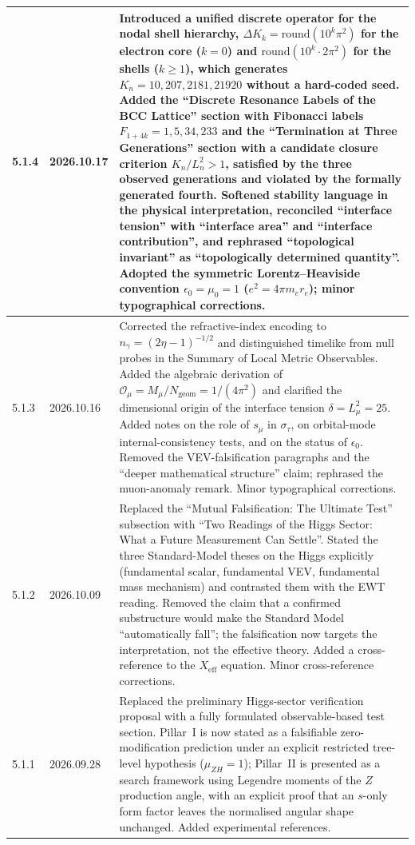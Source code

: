 \documentclass[10pt,a4paper]{article}
\begin{document}
\begin{longtable}{@{}p{1.6cm}p{1.8cm}p{10.1cm}@{}}
	5.1.4 & 2026.10.17 &
	Introduced a unified discrete operator for the nodal shell hierarchy,
	$\Delta K_k = \mathrm{round}(10^k \pi^2)$ for the electron core
	($k=0$) and $\mathrm{round}(10^k \cdot 2\pi^2)$ for the shells
	($k\geq 1$), which generates $K_n = 10, 207, 2181, 21920$ without a
	hard-coded seed. Added the ``Discrete Resonance Labels of the BCC
	Lattice'' section with Fibonacci labels $F_{1+4k} = 1, 5, 34, 233$
	and the ``Termination at Three Generations'' section with a candidate
	closure criterion $K_n/L_n^2 > 1$, satisfied by the three observed
	generations and violated by the formally generated fourth. Softened
	stability language in the physical interpretation, reconciled
	``interface tension'' with ``interface area'' and ``interface
	contribution'', and rephrased ``topological invariant'' as
	``topologically determined quantity''. Adopted the symmetric
	Lorentz--Heaviside convention $\epsilon_0 = \mu_0 = 1$
	($e^2 = 4\pi m_e r_e$); minor typographical corrections. \\
	\midrule
	
	5.1.3 & 2026.10.16 &
	Corrected the refractive-index encoding to $n_\gamma=(2\eta-1)^{-1/2}$
	and distinguished timelike from null probes in the Summary of Local
	Metric Observables. Added the algebraic derivation of
	$\mathcal{O}_\mu = M_\mu/N_{\text{geom}} = 1/(4\pi^2)$ and clarified the
	dimensional origin of the interface tension $\delta = L_\mu^2 = 25$.
	Added notes on the role of $s_\mu$ in $\sigma_\tau$, on orbital-mode
	internal-consistency tests, and on the status of $\epsilon_0$. Removed
	the VEV-falsification paragraphs and the ``deeper mathematical
	structure'' claim; rephrased the muon-anomaly remark. Minor
	typographical corrections. \\
	\midrule
	
	5.1.2 & 2026.10.09 &
	Replaced the ``Mutual Falsification: The Ultimate Test'' subsection
	with ``Two Readings of the Higgs Sector: What a Future Measurement
	Can Settle''. Stated the three Standard-Model theses on the Higgs
	explicitly (fundamental scalar, fundamental VEV, fundamental mass
	mechanism) and contrasted them with the EWT reading. Removed the
	claim that a confirmed substructure would make the Standard Model
	``automatically fall''; the falsification now targets the
	interpretation, not the effective theory. Added a cross-reference
	to the $X_{\text{eff}}$ equation. Minor cross-reference corrections. \\
	\midrule
	
	5.1.1 & 2026.09.28 &
	Replaced the preliminary Higgs-sector verification proposal with a
	fully formulated observable-based test section. Pillar~I is now
	stated as a falsifiable zero-modification prediction under an
	explicit restricted tree-level hypothesis ($\mu_{ZH} = 1$);
	Pillar~II is presented as a search framework using Legendre
	moments of the $Z$ production angle, with an explicit proof that
	an $s$-only form factor leaves the normalised angular shape
	unchanged. Added experimental references. \\
	\midrule
	

\end{longtable}
\end{document}
